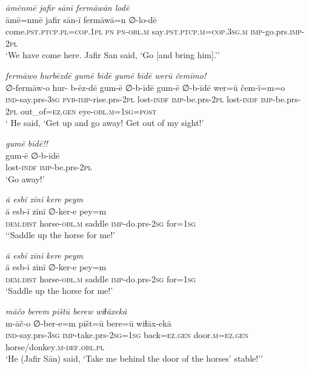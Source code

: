 \ea \label{ŠJ.36}
\textit{āmēnmē jafir sānī fermāwān lodē} \\ 
\gll āmē=nmē jafir sān-ī fermāwā=n ∅-lo-dē \\ 
 come\textsc{.pst}\textsc{.ptcp}\textsc{.pl}\textsc{=cop}\textsc{.\textsc{1pl}} \textsc{pn} \textsc{pn}\textsc{-obl}\textsc{.m} say\textsc{.pst}\textsc{.ptcp}\textsc{.m}\textsc{=cop}\textsc{.3sg}\textsc{.m} \textsc{imp-}go.prs.\textsc{imp-}\textsc{2pl} \\ 
\glt `We have come here. Jafir San said, ‘Go [and bring him].’'
\z 
 
\ea \label{ŠJ.37}
\textit{fermāwo hurbēzdē gumē bīdē gumē bīdē werū čemīmo!} \\ 
\gll ∅-fermāw-o hur- b-ēz-dē gum-ē ∅-b-īdē gum-ē ∅-b-īdē wer=ū čem-ī=m=o \\ 
 \textsc{ind-}say.prs\textsc{-3sg} \textsc{pvb-}\textsc{imp-}rise.prs-\textsc{2pl} lost\textsc{-indf} \textsc{imp-}be.prs-\textsc{2pl} lost\textsc{-indf} \textsc{imp-}be.prs-\textsc{2pl} out\_of\textsc{=ez.gen} eye\textsc{-obl}\textsc{.m}\textsc{=\textsc{1sg}}\textsc{=\textsc{post}} \\ 
\glt ` He said, ‘Get up and go away! Get out of my sight!'
\z 
 
\ea \label{ŠJ.38}
\textit{gumē bīdē!!} \\ 
\gll gum-ē ∅-b-īdē \\ 
 lost\textsc{-indf} \textsc{imp-}be.prs-\textsc{2pl} \\ 
\glt `Go away!'
\z 
 
\ea \label{ŠJ.52}
\textit{ā esbī zīnī kere peym} \\ 
\gll ā esb-ī zīnī ∅-ker-e pey=m \\ 
 \textsc{dem.dist} horse\textsc{-obl}\textsc{.m} saddle \textsc{imp-}do.prs-\textsc{2sg} for\textsc{=\textsc{1sg}} \\ 
\glt `‘Saddle up the horse for me!'
\z 
 
\ea \label{ŠJ.53}
\textit{ā esbī zīnī kere peym} \\ 
\gll ā esb-ī zīnī ∅-ker-e pey=m \\ 
 \textsc{dem.dist} horse\textsc{-obl}\textsc{.m} saddle \textsc{imp-}do.prs-\textsc{2sg} for\textsc{=\textsc{1sg}} \\ 
\glt `Saddle up the horse for me!'
\z 
 
\ea \label{ŠJ.62}
\textit{māčo berem pištū berew wiɫāxekā} \\ 
\gll m-āč-o ∅-ber-e=m pišt=ū bere=ū wiɫāx-ekā \\ 
 \textsc{ind-}say.prs\textsc{-3sg} \textsc{imp-}take.prs-\textsc{2sg}\textsc{=\textsc{1sg}} back\textsc{=ez.gen} door\textsc{.m}\textsc{=ez.gen} horse/donkey\textsc{.m}\textsc{-def}\textsc{.obl}\textsc{.pl} \\ 
\glt `He (Jafir Sān) said, ‘Take me behind the door of the horses’ stable!’'
\z 
 
